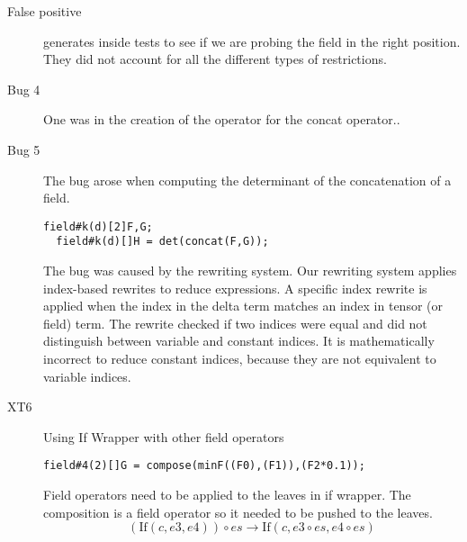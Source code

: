 \documentclass{article}
\begin{document}
\begin{description}
\item[False positive]
\checkname{} generates inside tests to see if we are probing the field in the right position.
They did not account for all the different types of restrictions.



\item[Bug 4]
One was in the creation of the \name{}  operator for the concat operator..

\item[Bug 5]
The bug arose when computing the determinant of the concatenation of a field.
\begin{lstlisting}[mathescape=true]
  field#k(d)[2]F,G;
  field#k(d)[]H = det(concat(F,G));
\end{lstlisting}
The bug was caused by the rewriting system.
Our rewriting system applies index-based rewrites to reduce \name{} expressions. 
A specific index rewrite is applied when the index in the delta term matches an index in tensor (or field)  term.
The rewrite checked if two indices were equal and did not distinguish between variable and constant indices.
It is mathematically incorrect to reduce constant indices, because they are not equivalent to variable indices.
\item[XT6]
Using If Wrapper with other field operators
\begin{lstlisting}[mathescape=true]
field#4(2)[]G = compose(minF((F0),(F1)),(F2*0.1));
\end{lstlisting}
Field operators need to be applied to the leaves in if wrapper. 
The composition is a field operator so it needed to be pushed to the leaves.
$$(\text{If}(c, e3,e4)) \circ es  
\rightarrow
\text{If}(c, e3  \circ es ,e4 \circ es) $$
\end{description}
\end{document}
